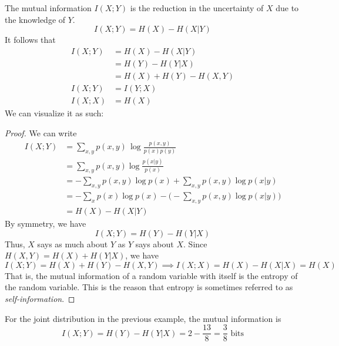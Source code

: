 \documentclass{article}
\begin{document}
  \begin{theorem}
  The mutual information $I(X;Y)$ is the reduction in the uncertainty of $X$ due to the knowledge of $Y$. 
  \[I(X;Y) = H(X) - H(X|Y)\]
  It follows that
  \begin{align*}
      I(X;Y) & = H(X) - H(X|Y) \\
      & = H(Y) - H(Y|X) \\
      & = H(X) + H(Y) - H(X, Y) \\
      I(X;Y) & = I(Y;X) \\
      I(X;X) & = H(X)
  \end{align*}
  We can visualize it as such: 
  \begin{center}
  \end{center}
  \end{theorem}
  \begin{proof}
  We can write
  \begin{align*}
      I(X;Y) & = \sum_{x, y} p(x, y) \, \log \frac{p(x, y)}{p(x)p(y)} \\
      & = \sum_{x, y} p(x, y) \log \frac{p(x|y)}{p(x)} \\
      & = - \sum_{x, y} p(x, y) \log p(x) + \sum_{x, y} p(x, y) \log p(x|y) \\
      & = - \sum_x p(x) \log p(x) - \Bigg( - \sum_{x, y} p(x, y) \log p(x|y) \Bigg) \\
      & = H(X) - H(X|Y)
  \end{align*}
  By symmetry, we have
  \[I(X;Y) = H(Y) - H(Y|X)\]
  Thus, $X$ says as much about $Y$ as $Y$ says about $X$. Since $H(X, Y) = H(X) + H(Y|X)$, we have
  \[I(X;Y) = H(X) + H(Y) - H(X, Y) \implies I(X;X) = H(X) - H(X|X) = H(X)\]
  That is, the mutual information of a random variable with itself is the entropy of the random variable. This is the reason that entropy is sometimes referred to as \textit{self-information}. 
  \end{proof}

  \begin{example}
  For the joint distribution in the previous example, the mutual information is 
  \[I(X;Y) = H(Y) - H(Y|X) = 2 - \frac{13}{8} = \frac{3}{8} \text{ bits}\]
  \end{example}
\end{document}
